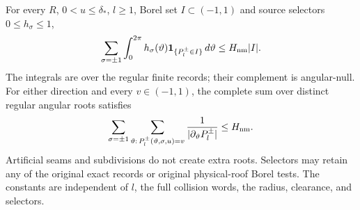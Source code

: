\begin{theorem}
\label{thm:nm-kernel}
For every $R$, $0<u\le\delta_*$, $l\ge1$, Borel set
$I\subset(-1,1)$ and source selectors $0\le h_\sigma\le1$,
\begin{equation}\label{eq:nm-kernel}
 \sum_{\sigma=\pm1}\int_0^{2\pi}
    h_\sigma(\vartheta)\mathbf1_{\{P_l^\pm\in I\}}\,d\vartheta
                   \le H_{\rm nm}|I|.
\end{equation}
The integrals are over the regular finite records; their complement
is angular-null.  For either direction and every $v\in(-1,1)$,
the complete sum over distinct regular angular roots satisfies
\begin{equation}\label{eq:nm-roots}
 \sum_{\sigma=\pm1}
 \sum_{\vartheta:\,P_l^\pm(\vartheta,\sigma,u)=v}
       \frac{1}{|\partial_\vartheta P_l^\pm|}
                    \le H_{\rm nm}.
\end{equation}
Artificial seams and subdivisions do not create extra roots.
Selectors may retain any of the original exact records or original
physical-roof Borel tests.  The constants are independent of $l$,
the full collision words, the radius, clearance, and selectors.
\end{theorem}
